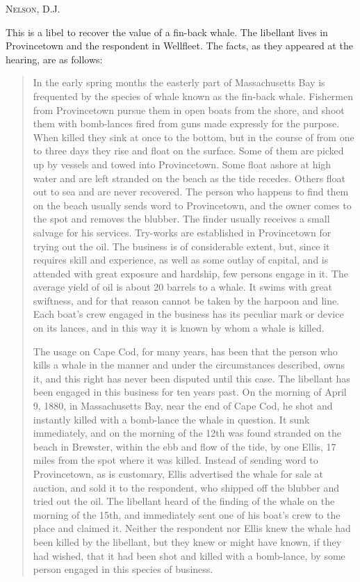


\opinion \textsc{Nelson}, D.J.

This is a libel to recover the value of a fin-back whale. The libellant lives in
Provincetown and the respondent in Wellfleet. The facts, as they appeared at the
hearing, are as follows:
\begin{quotation}
In the early spring months the easterly part of Massachusetts Bay is frequented
by the species of whale known as the fin-back whale. Fishermen from Provincetown
pursue them in open boats from the shore, and shoot them with bomb-lances fired
from guns made expressly for the purpose. When killed they sink at once to the
bottom, but in the course of from one to three days they rise and float on the
surface. Some of them are picked up by vessels and towed into Provincetown. Some
float ashore at high water and are left stranded on the beach as the tide
recedes. Others float out to sea and are never recovered. The person who happens
to find them on the beach usually sends word to Provincetown, and the owner
comes to the spot and removes the blubber. The finder usually receives a small
salvage for his services. Try-works are established in Provincetown for trying
out the oil. The business is of considerable extent, but, since it requires
skill and experience, as well as some outlay of capital, and is attended with
great exposure and hardship, few persons engage in it. The average yield of oil
is about 20 barrels to a whale. It swims with great swiftness, and for that
reason cannot be taken by the harpoon and line. Each boat's crew engaged in the
business has its peculiar mark or device on its lances, and in this way it is
known by whom a whale is killed.

The usage on Cape Cod, for many years, has been that the person who kills a
whale in the manner and under the circumstances described, owns it, and this
right has never been disputed until this case. The libellant has been engaged in
this business for ten years past. On the morning of April 9, 1880, in
Massachusetts Bay, near the end of Cape Cod, he shot and instantly killed with a
bomb-lance the whale in question. It sunk immediately, and on the morning of the
12th was found stranded on the beach in Brewster, within the ebb and flow of the
tide, by one Ellis, 17 miles from the spot where it was killed. Instead of
sending word to Provincetown, as is customary, Ellis advertised the whale for
sale at auction, and sold it to the respondent, who shipped off the blubber and
tried out the oil. The libellant heard of the finding of the whale on the
morning of the 15th, and immediately sent one of his boat's crew to the place
and claimed it. Neither the respondent nor Ellis knew the whale had been killed
by the libellant, but they knew or might have known, if they had wished, that it
had been shot and killed with a bomb-lance, by some person engaged in this
species of business.
\end{quotation}
